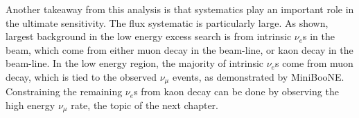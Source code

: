 Another takeaway from this analysis is that systematics play an important role in the ultimate sensitivity. The flux systematic is particularly large. As shown, largest background in the low energy excess search is from intrinsic $\nu_e$s in the beam, which come from either muon decay in the beam-line, or kaon decay in the beam-line. In the low energy region, the majority of intrinsic $\nu_e$s come from muon decay, which is tied to the observed $\nu_\mu$ events, as demonstrated by MiniBooNE. Constraining the remaining $\nu_e$s from kaon decay can be done by observing the high energy $\nu_\mu$ rate, the topic of the next chapter.

